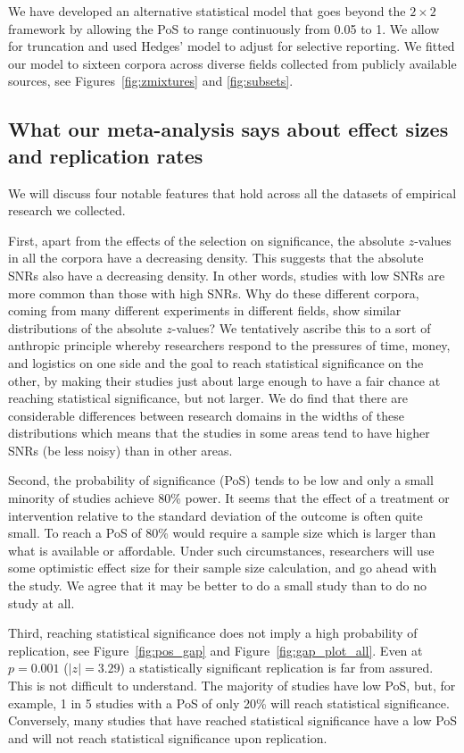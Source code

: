 \documentclass[11pt]{article}
\begin{document}
We have developed an alternative statistical model that goes beyond the $2\times 2$ framework by allowing the PoS to range continuously from 0.05 to 1. We allow for truncation and used Hedges' model to adjust for selective reporting. We fitted our model to sixteen corpora across diverse fields collected from publicly available sources, see Figures~\ref{fig:zmixtures} and \ref{fig:subsets}.

\subsection{What our meta-analysis says about effect sizes and replication rates}

We will discuss four notable features that hold across all the datasets of empirical research we collected. 

First, apart from the effects of the selection on significance, the absolute $z$-values in all the corpora have a decreasing density. This suggests that the absolute SNRs also have a decreasing density. In other words, studies with low SNRs are more common than those with high SNRs. Why do these different corpora, coming from many different experiments in different fields, show similar distributions of the absolute $z$-values? We tentatively ascribe this to a sort of anthropic principle \parencite{anthropic} whereby researchers respond to the pressures of time, money, and logistics on one side and the goal to reach statistical significance on the other, by making their studies just about large enough to have a fair chance at reaching statistical significance, but not larger. We do find that there are considerable differences between research domains in the widths of these distributions which means that the studies in some areas tend to have higher SNRs (be less noisy) than in other areas. 

Second, the probability of significance (PoS) tends to be low and only a small minority of studies achieve 80\% power. It seems that the effect of a treatment or intervention relative to the standard deviation of the outcome is often quite small. To reach a PoS of 80\% would require a sample size which is larger than what is available or affordable. Under such circumstances, researchers will use some optimistic effect size for their sample size calculation, and go ahead with the study. We agree that it may be better to do a small study than to do no study at all. 

Third, reaching statistical significance does not imply a high probability of replication, see Figure~\ref{fig:pos_gap} and Figure~\ref{fig:gap_plot_all}. Even at $p = 0.001$ ($|z|=3.29$) a statistically significant replication is far from assured. This is not difficult to understand. The majority of studies have low PoS, but, for example, 1 in 5 studies with a PoS of only 20\% will reach statistical significance. Conversely, many studies that have reached statistical significance have a low PoS and will not reach statistical significance upon replication.
\end{document}
